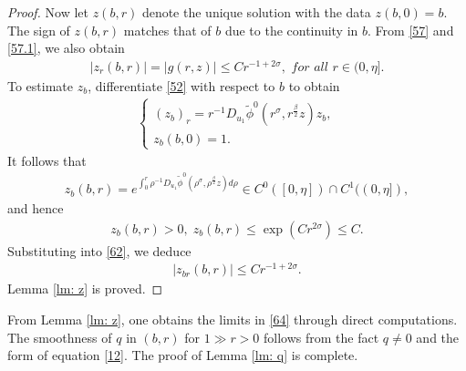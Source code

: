 \documentclass[12pt]{amsart}
\begin{document}
\begin{proof}
Now let $z(b, r)$ denote the unique solution with the data $z(b,0)=b$. 
The sign of $z(b, r)$ matches that of $b$ due to the continuity in $b$. From \eqref{57} and \eqref{57.1}, we also obtain 
\begin{align*}
|z_r(b,r)|=|g(r,z)|\le Cr^{-1+2\sigma}, \textit{ for all }r\in (0, \eta].
\end{align*}
To estimate $z_b$, differentiate \eqref{52} with respect to $b$ to obtain
\begin{align}\label{62}
\begin{cases}
(z_b)_r=r^{-1}D_{u_1}\tilde \phi^0(r^\sigma, r^{\frac{\beta}2} z)z_b, \\
z_b(b,0)=1. 
\end{cases}
\end{align}
It follows that 
\begin{align*}
z_b(b,r)=e^{\int_0^r \rho^{-1}D_{u_1}\tilde \phi^0(\rho^\sigma, \rho^{\frac \beta 2}z)d\rho} \in C^0([0, \eta]) \cap C^1 ((0, \eta]), 
\end{align*}
and hence
\begin{align*}
z_b(b,r)>0, \; z_b(b,r)\le \exp({Cr^{2\sigma}})\le C. 
\end{align*}
Substituting into \eqref{62}, we deduce
\begin{align*}
|z_{br} (b,r)|\le C r^{-1+2\sigma}.  
\end{align*}
Lemma \ref{lm: z} is proved. 
\end{proof}


From Lemma \ref{lm: z}, one obtains the limits in \eqref{64} through direct computations. The smoothness of $q$ in $(b, r)$ for $1 \gg r > 0$ follows from the fact $q \ne 0$ and the form of equation \eqref{12}. The proof of Lemma \ref{lm: q} is complete.
\end{document}

